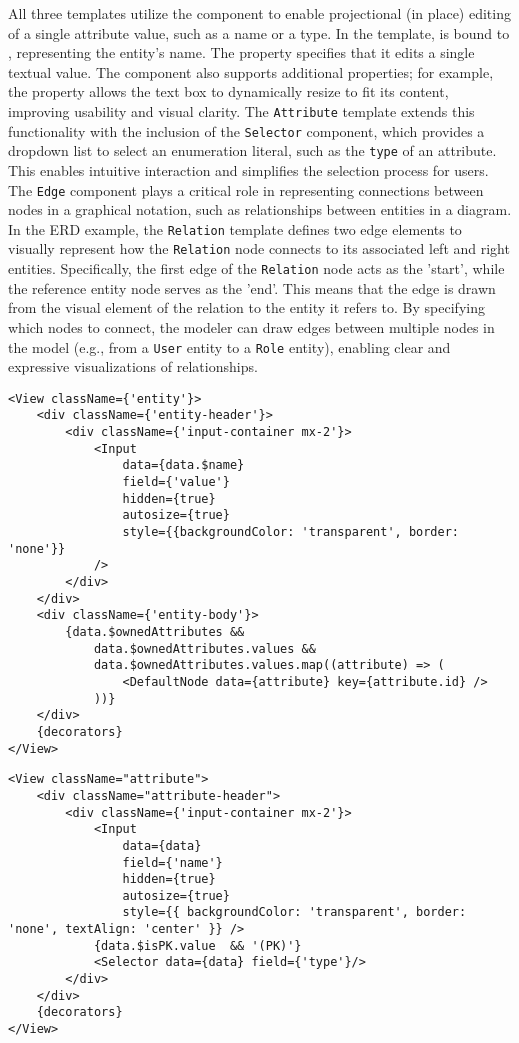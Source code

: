 All three templates utilize the  component to enable projectional (in place) editing of a single attribute value, such as a name or a type. In the  template,  is bound to , representing the entity’s name. The property  specifies that it edits a single textual value. The component  also supports additional properties; for example, the property  allows the text box to dynamically resize to fit its content, improving usability and visual clarity.
%
The \texttt{Attribute} template extends this functionality with the inclusion of the \texttt{Selector} component, which provides a dropdown list to select an enumeration literal, such as the \texttt{type} of an attribute. This enables intuitive interaction and simplifies the selection process for users.
%
The \texttt{Edge} component plays a critical role in representing connections between nodes in a graphical notation, such as relationships between entities in a diagram. In the ERD example, the \texttt{Relation} template defines two edge elements to visually represent how the \texttt{Relation} node connects to its associated left and right entities. Specifically, the first edge of the \texttt{Relation} node acts as the 'start', while the reference entity node serves as the 'end'. This means that the edge is drawn from the visual element of the relation to the entity it refers to. By specifying which nodes to connect, the modeler can draw edges between multiple nodes in the model (e.g., from a \texttt{User} entity to a \texttt{Role} entity), enabling clear and expressive visualizations of relationships.
\begin{lstlisting}[language=JSX-template,caption=ERD Entity template.,label=lst:entity-template]
<View className={'entity'}>
    <div className={'entity-header'}>
        <div className={'input-container mx-2'}>
            <Input
                data={data.$name}
                field={'value'}
                hidden={true}
                autosize={true}
                style={{backgroundColor: 'transparent', border: 'none'}}
            />
        </div>
    </div>
    <div className={'entity-body'}>
        {data.$ownedAttributes &&
            data.$ownedAttributes.values &&
            data.$ownedAttributes.values.map((attribute) => (
                <DefaultNode data={attribute} key={attribute.id} />
            ))}
    </div>
    {decorators}
</View>
\end{lstlisting}
\begin{lstlisting}[language=JSX-template,caption=ERD Attribute template.,label=lst:attribute-template]
<View className="attribute">
    <div className="attribute-header">
        <div className={'input-container mx-2'}>
            <Input
                data={data}
                field={'name'}
                hidden={true}
                autosize={true}
                style={{ backgroundColor: 'transparent', border: 'none', textAlign: 'center' }} />
            {data.$isPK.value  && '(PK)'}
            <Selector data={data} field={'type'}/>
        </div>
    </div>
    {decorators}
</View>
\end{lstlisting}

